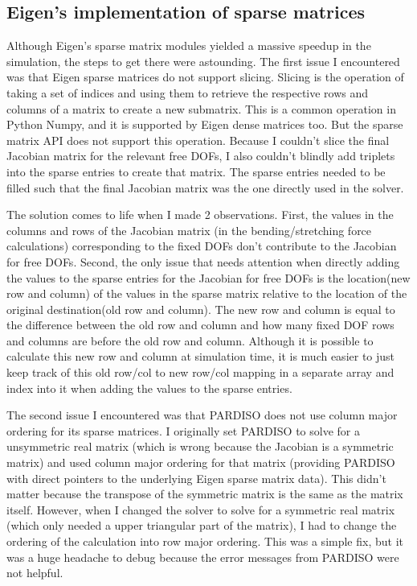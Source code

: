 \documentclass[letterpaper, 10 pt, conference]{ieeeconf}  %
\begin{document}
\subsection{Eigen's implementation of sparse matrices}
        Although Eigen's sparse matrix modules yielded a massive speedup in the simulation, the steps to get there were astounding. The first issue I encountered was that Eigen sparse matrices do not support slicing. Slicing is the operation of taking a set of indices and using them to retrieve the respective rows and columns of a matrix to create a new submatrix. This is a common operation in Python Numpy, and it is supported by Eigen dense matrices too. But the sparse matrix API does not support this operation. Because I couldn't slice the final Jacobian matrix for the relevant free DOFs, I also couldn't blindly add triplets into the sparse entries to create that matrix. The sparse entries needed to be filled such that the final Jacobian matrix was the one directly used in the solver. 

        The solution comes to life when I made 2 observations. First, the values in the columns and rows of the Jacobian matrix (in the bending/stretching force calculations) corresponding to the fixed DOFs don't contribute to the Jacobian for free DOFs. Second, the only issue that needs attention when directly adding the values to the sparse entries for the Jacobian for free DOFs is the location(new row and column) of the values in the sparse matrix relative to the location of the original destination(old row and column). The new row and column is equal to the difference between the old row and column and how many fixed DOF rows and columns are before the old row and column. Although it is possible to calculate this new row and column at simulation time, it is much easier to just keep track of this old row/col to new row/col mapping in a separate array and index into it when adding the values to the sparse entries. 
        
        The second issue I encountered was that PARDISO does not use column major ordering for its sparse matrices. I originally set PARDISO to solve for a unsymmetric real matrix (which is wrong because the Jacobian is a symmetric matrix) and used column major ordering for that matrix (providing PARDISO with direct pointers to the underlying Eigen sparse matrix data). This didn't matter because the transpose of the symmetric matrix is the same as the matrix itself. However, when I changed the solver to solve for a symmetric real matrix (which only needed a upper triangular part of the matrix), I had to change the ordering of the calculation into row major ordering. This was a simple fix, but it was a huge headache to debug because the error messages from PARDISO were not helpful.
\end{document}
